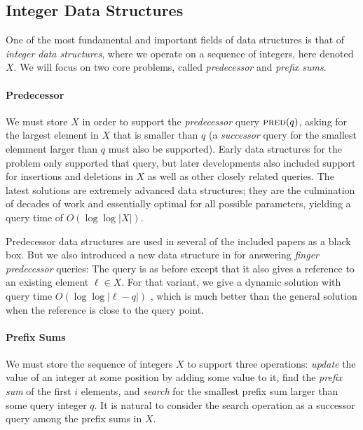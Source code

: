 
\subsection{Integer Data Structures}
One of the most fundamental and important fields of data structures is that of \emph{integer data structures}, where we operate on a sequence of integers, here denoted $X$. We will focus on two core problems, called \emph{predecessor} and \emph{prefix sums}.

\paragraph{Predecessor}
We must store $X$ in order to support the \emph{predecessor} query $\textsc{pred}(q)$, asking for the largest element in $X$ that is smaller than $q$ (a \emph{successor} query for the smallest elemment larger than $q$ must also be supported). Early data structures for the problem only supported that query, but later developments also included support for insertions and deletions in $X$ as well as other closely related queries. The latest solutions are extremely advanced data structures; they are the culmination of decades of work and essentially optimal for all possible parameters, yielding a query time of $O(\log \log |X|)$. 

Predecessor data structures are used in several of the included papers as a black box. But we also introduced a new data structure in  for answering \emph{finger predecessor} queries: The query is as before except that it also gives a reference to an existing element $\ell \in X$. For that variant, we give a dynamic solution with query time $O(\log \log |\ell-q|)$ , which is much better than the general solution when the reference is close to the query point.

\paragraph{Prefix Sums}
We must store the sequence of integers $X$ to support three operations: \emph{update} the value of an integer at some position by adding some value to it, find the \emph{prefix sum} of the first $i$ elements, and \emph{search} for the smallest prefix sum larger than some query integer $q$. It is natural to consider the search operation as a successor query among the prefix sums in $X$. 

